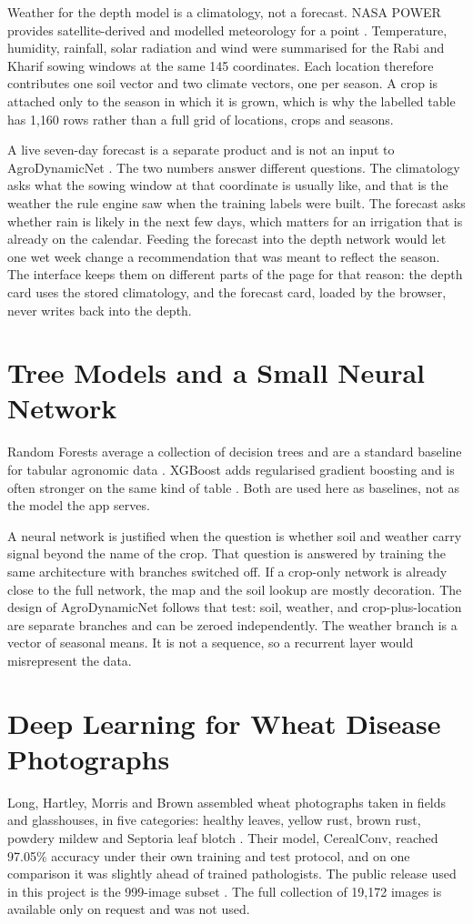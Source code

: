 Weather for the depth model is a climatology, not a forecast. NASA POWER provides satellite-derived and modelled meteorology for a point \cite{nasapower}. Temperature, humidity, rainfall, solar radiation and wind were summarised for the Rabi and Kharif sowing windows at the same 145 coordinates. Each location therefore contributes one soil vector and two climate vectors, one per season. A crop is attached only to the season in which it is grown, which is why the labelled table has 1{,}160 rows rather than a full grid of locations, crops and seasons.

A live seven-day forecast is a separate product and is not an input to AgroDynamicNet \cite{openmeteo}. The two numbers answer different questions. The climatology asks what the sowing window at that coordinate is usually like, and that is the weather the rule engine saw when the training labels were built. The forecast asks whether rain is likely in the next few days, which matters for an irrigation that is already on the calendar. Feeding the forecast into the depth network would let one wet week change a recommendation that was meant to reflect the season. The interface keeps them on different parts of the page for that reason: the depth card uses the stored climatology, and the forecast card, loaded by the browser, never writes back into the depth.

\section{Tree Models and a Small Neural Network}
Random Forests average a collection of decision trees and are a standard baseline for tabular agronomic data \cite{breiman2001}. XGBoost adds regularised gradient boosting and is often stronger on the same kind of table \cite{chen2016xgboost}. Both are used here as baselines, not as the model the app serves.

A neural network is justified when the question is whether soil and weather carry signal beyond the name of the crop. That question is answered by training the same architecture with branches switched off. If a crop-only network is already close to the full network, the map and the soil lookup are mostly decoration. The design of AgroDynamicNet follows that test: soil, weather, and crop-plus-location are separate branches and can be zeroed independently. The weather branch is a vector of seasonal means. It is not a sequence, so a recurrent layer would misrepresent the data.

\section{Deep Learning for Wheat Disease Photographs}
Long, Hartley, Morris and Brown assembled wheat photographs taken in fields and glasshouses, in five categories: healthy leaves, yellow rust, brown rust, powdery mildew and Septoria leaf blotch \cite{long2023wheat}. Their model, CerealConv, reached 97.05\% accuracy under their own training and test protocol, and on one comparison it was slightly ahead of trained pathologists. The public release used in this project is the 999-image subset \cite{long2023data}. The full collection of 19{,}172 images is available only on request and was not used.

